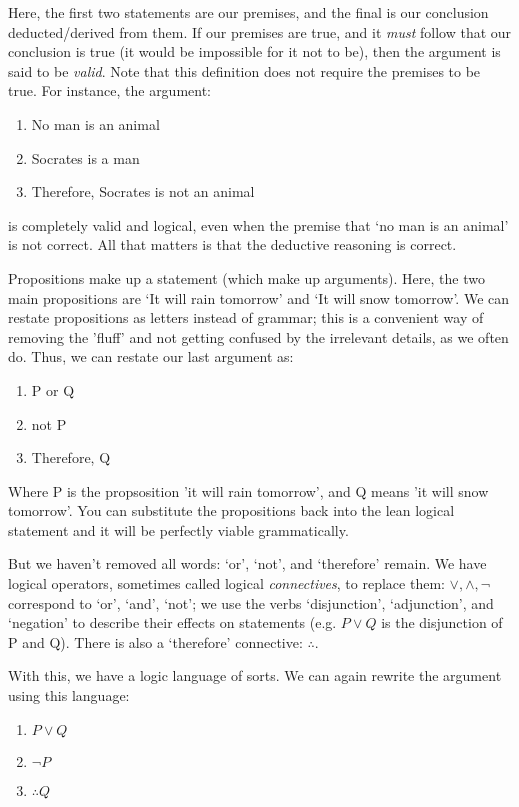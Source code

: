 \documentclass[a4paper, 11pt]{article}
\begin{document}
Here, the first two statements are our premises, and the final is our conclusion deducted/derived from them. If our premises are true, and it \textit{must} follow that our conclusion is true (it would be impossible for it not to be), then the argument is said to be \textit{valid}. Note that this definition does not require the premises to be true. For instance, the argument:

\begin{enumerate}
  \item No man is an animal
  \item Socrates is a man
  \item Therefore, Socrates is not an animal
\end{enumerate}
is completely valid and logical, even when the premise that `no man is an animal' is not correct. All that matters is that the deductive reasoning is correct.

Propositions make up a statement (which make up arguments). Here, the two main propositions are `It will rain tomorrow' and `It will snow tomorrow'. We can restate propositions as letters instead of grammar; this is a convenient way of removing the 'fluff' and not getting confused by the irrelevant details, as we often do. Thus, we can restate our last argument as:

\begin{enumerate}
  \item P or Q
  \item not P
  \item Therefore, Q
\end{enumerate}

Where P is the propsosition 'it will rain tomorrow', and Q means 'it will snow tomorrow'. You can substitute the propositions back into the lean logical statement and it will be perfectly viable grammatically.

But we haven't removed all words: `or', `not', and `therefore' remain. We have logical operators, sometimes called logical \textit{connectives}, to replace them: $\vee, \wedge, \neg$ correspond to `or', `and', `not'; we use the verbs `disjunction', `adjunction', and `negation' to describe their effects on statements (e.g. $P \vee Q$ is the disjunction of P and Q). There is also a `therefore' connective: $\therefore$.

With this, we have a logic language of sorts. We can again rewrite the argument using this language:

\begin{enumerate}
  \item $P \vee Q$
  \item $\neg P$
  \item $\therefore Q$
\end{enumerate}
\end{document}
